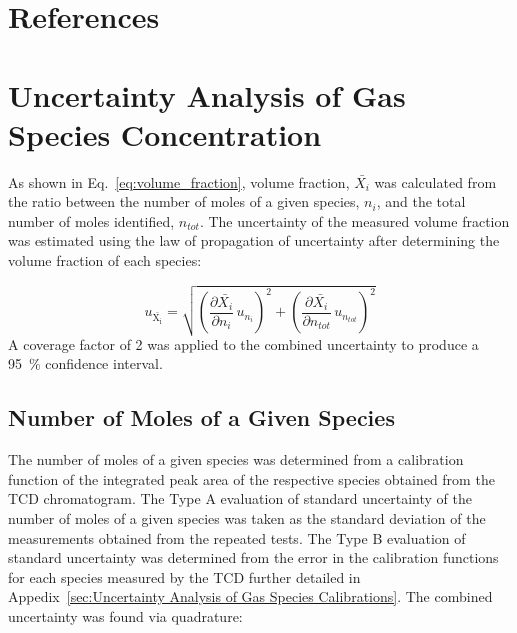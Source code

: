 \documentclass[12pt]{article}
\begin{document}
\pagebreak

\section*{References}




\pagebreak


\appendix
{}
\makeatletter
\newcommand{\section@cntformat}{Appendix:\ }
\makeatother

\section{Uncertainty Analysis of Gas Species Concentration} \label{sec:UncertaintyGasSpecies}

As shown in Eq.~\ref{eq:volume_fraction}, volume fraction, $\bar{X_{i}}$ was calculated from the ratio between the number of moles of a given species, $n_{i}$, and the total number of moles identified, $n_{tot}$. The uncertainty of the measured volume fraction was estimated using the law of propagation of uncertainty after determining the volume fraction of each species:

\begin{equation}
\label{eq:Volume_Frac_Uncertainty}
u_\mathrm{\bar{X_{i}}} = \sqrt{{\left( \frac{\partial \bar{X_{i}}}{\partial n_{i}}\,u_{\scriptscriptstyle n_{i}} \right)}^2+{\left(\frac{\partial \bar{X_{i}}}{\partial n_{tot}}\,u_{\scriptscriptstyle n_{tot}}\right)}^2}
\end{equation}
A coverage factor of 2 was applied to the combined uncertainty to produce a 95~\% confidence interval.

\subsection{Number of Moles of a Given Species}
\label{ssec:Number_of_Moles_of_a_Given_Species}

The number of moles of a given species was determined from a calibration function of the integrated peak area of the respective species obtained from the TCD chromatogram. The Type A evaluation of standard uncertainty of the number of moles of a given species was taken as the standard deviation of the measurements obtained from the repeated tests. The Type B evaluation of standard uncertainty was determined from the error in the calibration functions for each species measured by the TCD further detailed in Appedix~\ref{sec:Uncertainty Analysis of Gas Species Calibrations}. The combined uncertainty was found via quadrature:
\end{document}
